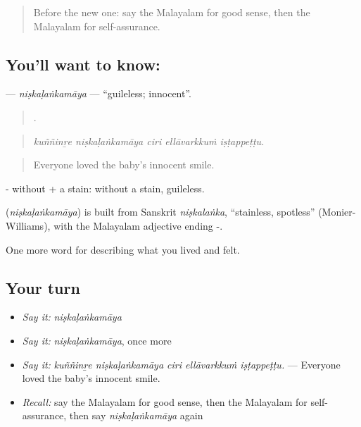 \label{lesson:ML-C529-niskalankamaya}



\begin{quote}
Before the new one: say the Malayalam for good sense, then the Malayalam for self-assurance.
\end{quote}

\subsection*{You'll want to know: }
\textbf{} — \emph{niṣkaḷaṅkamāya} — \textquotedblleft{}guileless; innocent\textquotedblright{}.

\begin{quote}
    .
\end{quote}

\begin{quote}
\emph{kuññinṟe niṣkaḷaṅkamāya ciri ellāvarkkuṁ iṣṭappeṭṭu.}
\end{quote}

\begin{quote}
Everyone loved the baby's innocent smile.
\end{quote}

- without +  a stain: without a stain, guileless.

\begin{cousinweb}
\textbf{} (\emph{niṣkaḷaṅkamāya}) is built from Sanskrit \emph{niṣkalaṅka}, \textquotedblleft{}stainless, spotless\textquotedblright{} (Monier-Williams), with the Malayalam adjective ending -.
\end{cousinweb}

\begin{grammarlens}[title={What you've built}]
One more word for describing what you lived and felt.
\end{grammarlens}

\subsection*{Your turn}
\begin{itemize}
\raggedright
  \item \emph{Say it:} \emph{niṣkaḷaṅkamāya}
  \item \emph{Say it:} \emph{niṣkaḷaṅkamāya}, once more
  \item \emph{Say it:} \emph{kuññinṟe niṣkaḷaṅkamāya ciri ellāvarkkuṁ iṣṭappeṭṭu.} — Everyone loved the baby's innocent smile.
  \item \emph{Recall:} say the Malayalam for good sense, then the Malayalam for self-assurance, then say \emph{niṣkaḷaṅkamāya} again
\end{itemize}

